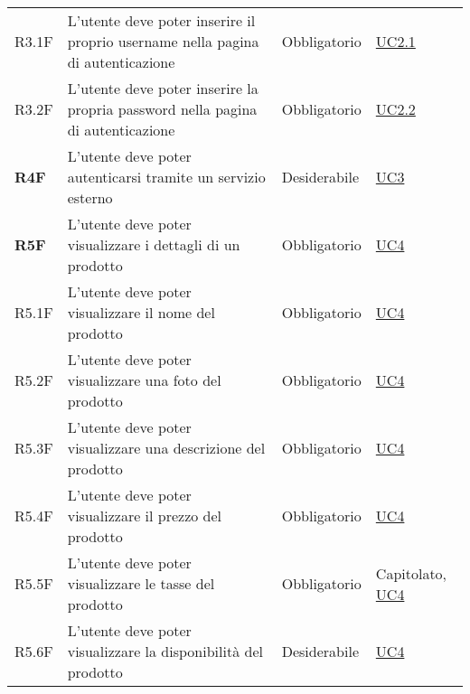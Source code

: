 \begin{center}
\begin{longtable}[!h]{p{50px} p{245px} p{75px} p{50px}}
        R3.1F                                 & L'utente deve poter inserire il proprio username nella pagina di autenticazione                     & Obbligatorio             & \hyperref[sec:UC2.1]{UC2.1}                    \\
        R3.2F                                 & L'utente deve poter inserire la propria password nella pagina di autenticazione                     & Obbligatorio             & \hyperref[sec:UC2.2]{UC2.2}                    \\
        \textbf{R4F}                          & L'utente deve poter autenticarsi tramite un servizio esterno                                        & Desiderabile             & \hyperref[sec:UC3]{UC3}                        \\
        \textbf{R5F}                          & L'utente deve poter visualizzare i dettagli di un prodotto                                          & Obbligatorio             & \hyperref[sec:UC4]{UC4}                        \\
        R5.1F                                 & L'utente deve poter visualizzare il nome del prodotto                                               & Obbligatorio             & \hyperref[sec:UC4]{UC4}                        \\
        R5.2F                                 & L'utente deve poter visualizzare una foto del prodotto                                              & Obbligatorio             & \hyperref[sec:UC4]{UC4}                        \\
        R5.3F                                 & L'utente deve poter visualizzare una descrizione del prodotto                                       & Obbligatorio             & \hyperref[sec:UC4]{UC4}                        \\
        R5.4F                                 & L'utente deve poter visualizzare il prezzo del prodotto                                             & Obbligatorio             & \hyperref[sec:UC4]{UC4}                        \\
        R5.5F                                 & L'utente deve poter visualizzare le tasse del prodotto                                              & Obbligatorio             & Capitolato, \newline \hyperref[sec:UC4]{UC4}   \\
        R5.6F                                 & L'utente deve poter visualizzare la disponibilità del prodotto                                      & Desiderabile             & \hyperref[sec:UC4]{UC4}                        \\

\end{longtable}
\end{center}
